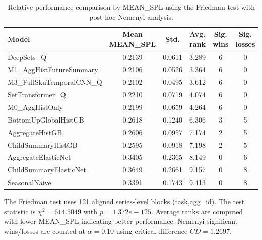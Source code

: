 \begin{table}[H]
\centering
\caption{Relative performance comparison by MEAN_SPL using the Friedman test with post-hoc Nemenyi analysis.}
\label{tab:stats_mean_spl}
\begin{threeparttable}
\begin{tabular}{lccccc}
\toprule
Model & Mean MEAN_SPL & Std. & Avg. rank & Sig. wins & Sig. losses \\
\midrule
DeepSets\_Q & 0.2139 & 0.0611 & 3.289 & 6 & 0 \\
M1\_AggHistFutureSummary & 0.2106 & 0.0526 & 3.364 & 6 & 0 \\
M3\_FullSkuTemporalCNN\_Q & 0.2102 & 0.0495 & 3.612 & 6 & 0 \\
SetTransformer\_Q & 0.2210 & 0.0719 & 4.074 & 6 & 0 \\
M0\_AggHistOnly & 0.2199 & 0.0659 & 4.264 & 6 & 0 \\
BottomUpGlobalHistGB & 0.2618 & 0.1240 & 6.306 & 3 & 5 \\
AggregateHistGB & 0.2606 & 0.0957 & 7.174 & 2 & 5 \\
ChildSummaryHistGB & 0.2595 & 0.0918 & 7.198 & 2 & 5 \\
AggregateElasticNet & 0.3405 & 0.2365 & 8.149 & 0 & 6 \\
ChildSummaryElasticNet & 0.3649 & 0.2661 & 9.157 & 0 & 8 \\
SeasonalNaive & 0.3391 & 0.1743 & 9.413 & 0 & 8 \\
\bottomrule
\end{tabular}
\begin{tablenotes}
\footnotesize \item The Friedman test uses 121 aligned series-level blocks (task,agg\_id). The test statistic is $\chi^2=614.5049$ with $p=1.372e-125$. Average ranks are computed with lower MEAN_SPL indicating better performance. Nemenyi significant wins/losses are counted at $\alpha=0.10$ using critical difference $CD=1.2697$.
\end{tablenotes}
\end{threeparttable}
\end{table}
